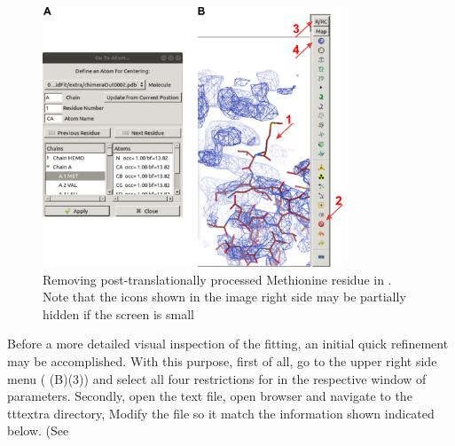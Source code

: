   \begin{figure}[H]
  \centering 
  \captionsetup{width=.7\linewidth} 
  \includegraphics[width=0.80\textwidth]{Images/Fig27}
  \caption{Removing post-translationally processed Methionine residue in \coot. Note that the icons shown in the image right side may be partially hidden if the screen is small}
  \label{fig:coot_go_to_atom}
  \end{figure}
  
  Before a more detailed visual inspection of the  fitting, an initial quick refinement may be accomplished. With this purpose, first of all, go to the upper right side menu ( (B)(3)) and select all four restrictions for  in the respective window of parameters. Secondly, open the  text file, 
  open \scipion browser and navigate to the ttt{extra} directory, Modify the file so it match the information shown indicated below. (See \\
  \ttt{[myvars]}\\
  \\
  \\
  \\
  \\
  \\
  
